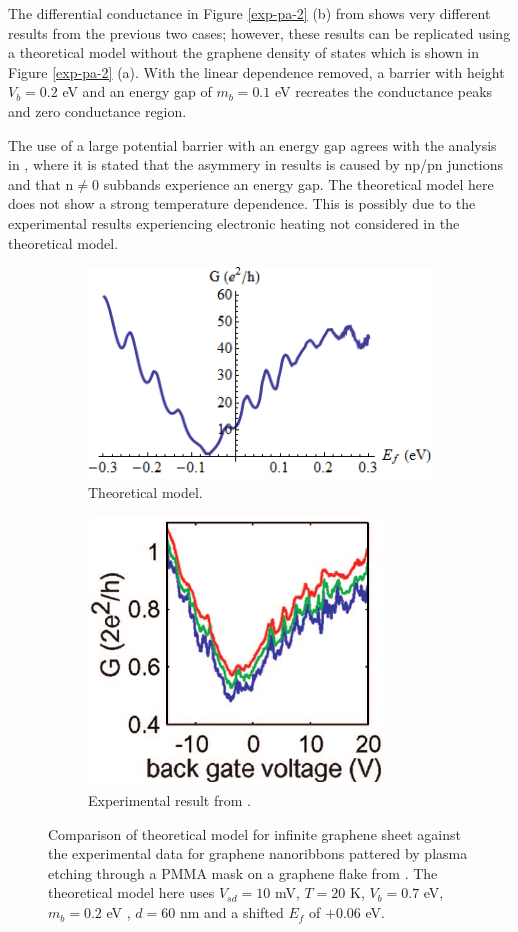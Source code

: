 		The differential conductance in Figure \ref{exp-pa-2} (b) from \cite{b19} shows very different results from the previous two cases; however, these results can be replicated using a theoretical model without the graphene density of states which is shown in Figure \ref{exp-pa-2} (a). With the linear dependence removed, a barrier with height $V_{b}=0.2$ eV and an energy gap of $m_{b}=0.1$ eV recreates the conductance peaks and zero conductance region.

		The use of a large potential barrier with an energy gap agrees with the analysis in \cite{b19}, where it is stated that the asymmery in results is caused by np/pn junctions and that n$\neq$0 subbands experience an energy gap. The theoretical model here does not show a strong temperature dependence. This is possibly due to the experimental results experiencing electronic heating not considered in the theoretical model.

		\begin{figure}[h]
			\begin{subfigure}{0.45\textwidth}
				\centerline{\includegraphics[scale=0.5]{images/exp-b-1}}
				\caption{Theoretical model.}
			\end{subfigure}
			\hspace{1cm}
			\begin{subfigure}{0.45\textwidth}
				\centerline{\includegraphics[scale=0.6]{images/exp-pb-1}}
				\caption{Experimental result from \cite{b20}.}
			\end{subfigure}
			\caption{Comparison of theoretical model for infinite graphene sheet against the experimental data for graphene nanoribbons pattered by plasma etching through a PMMA mask on a graphene flake from \cite{b20}. The theoretical model here uses $V_{sd}=10$ mV, $T=20$ K, $V_{b}=0.7$ eV, $m_{b}=0.2$ eV , $d=60$ nm and a shifted $E_{f}$ of $+0.06$ eV.}
			\label{exp-pb-1}
		\end{figure}

